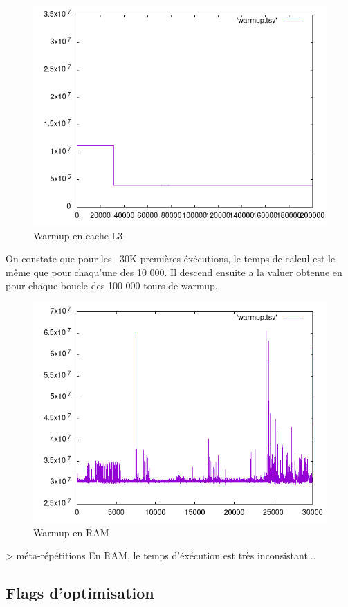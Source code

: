 \documentclass{report}
\begin{document}
\newpage
    \begin{figure}[ht!]
        \centering
        \includegraphics[width=120mm]{MEDIA/warmupL3_200000.png}
        \caption{Warmup en cache L3 }
    \end{figure}

    On constate que pour les ~30K premières éxécutions, le temps de calcul est le même que pour chaqu'une des 10 000. Il descend ensuite a la valuer obtenue en pour chaque boucle des 100 000 tours de warmup.
   \newpage
   \begin{figure}[ht!]
        \centering
        \includegraphics[width=120mm]{MEDIA/warmupRAM.png}
        \caption{Warmup en RAM }
    \end{figure}> méta-répétitions
En RAM, le temps d'éxécution est très inconsistant...
\newpage
\subsection*{Flags d'optimisation}
\end{document}

